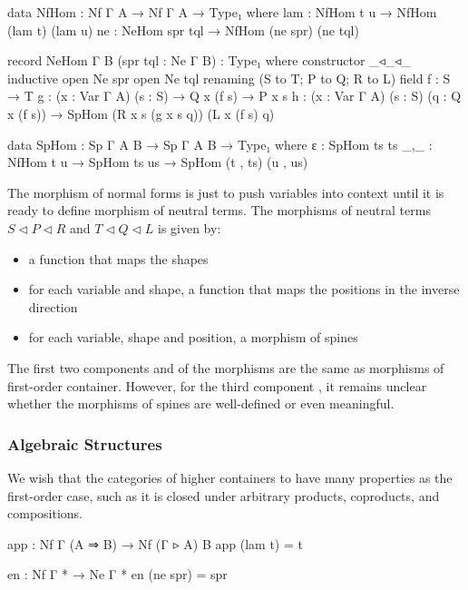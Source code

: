 \begin{code}
  data NfHom : Nf Γ A → Nf Γ A → Type₁ where
    lam : NfHom t u → NfHom (lam t) (lam u)
    ne  : NeHom spr tql → NfHom (ne spr) (ne tql)

  record NeHom {Γ} {B} (spr tql : Ne Γ B) : Type₁ where
    constructor _◃_◃_
    inductive
    open Ne spr
    open Ne tql renaming (S to T; P to Q; R to L)
    field
      f : S → T
      g : (x : Var Γ A) (s : S) → Q x (f s) → P x s
      h : (x : Var Γ A) (s : S) (q : Q x (f s))
        → SpHom (R x s (g x s q)) (L x (f s) q)
        
  data SpHom : Sp Γ A B → Sp Γ A B → Type₁ where
    ε   : SpHom ts ts
    _,_ : NfHom t u → SpHom ts us → SpHom (t , ts) (u , us)
\end{code}

The morphism of normal forms is just to push variables into context until it is ready to define morphism of neutral terms. The morphisms of neutral terms $S \triangleleft P \triangleleft R$ and $T \triangleleft Q \triangleleft L$ is given by:

\begin{itemize}
  \item{a function that maps the shapes}
  \item{for each variable and shape, a function that maps the positions in the inverse direction}
  \item{for each variable, shape and position, a morphism of spines}
\end{itemize}

The first two components  and  of the morphisms are the same as morphisms of first-order container. However, for the third component , it remains unclear whether the morphisms of spines are well-defined or even meaningful.

\subsubsection*{Algebraic Structures}

We wish that the categories of higher containers to have many properties as the first-order case, such as it is closed under arbitrary products, coproducts, and compositions.

\begin{code}
app : Nf Γ (A ⇒ B) → Nf (Γ ▹ A) B
app (lam t) = t

en : Nf Γ * → Ne Γ *
en (ne spr) = spr
\end{code}


